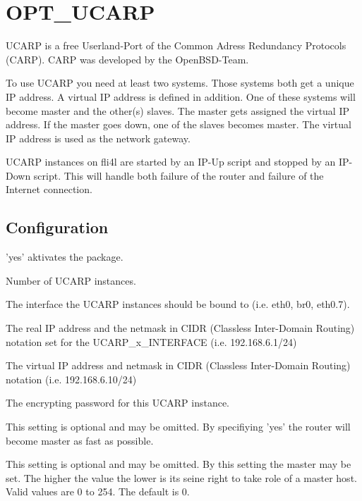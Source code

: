 {
\section {OPT\_UCARP}
}

UCARP is a free Userland-Port of the Common Adress Redundancy Protocols
(CARP). CARP was developed by the OpenBSD-Team.

To use UCARP you need at least two systems. Those systems both get
a unique IP address. A virtual IP address is defined in addition.
One of these systems will become master and the other(s) slaves. The master
gets assigned the virtual IP address. If the master goes down, one of the
slaves becomes master.
The virtual IP address is used as the network gateway.

UCARP instances on fli4l are started by an IP-Up script and stopped
by an IP-Down script. This will handle both failure of the router
and failure of the Internet connection.

\subsection{Configuration}

\begin{description}

'yes' aktivates the package.

Number of UCARP instances.

The interface the UCARP instances should be bound to
(i.e. eth0, br0, eth0.7).

The real IP address and the netmask in CIDR (Classless Inter-Domain Routing)
notation set for the UCARP\_x\_INTERFACE (i.e. 192.168.6.1/24)

The virtual IP address and netmask in CIDR (Classless Inter-Domain
Routing) notation (i.e. 192.168.6.10/24)

The encrypting password for this UCARP instance.

This setting is optional and may be omitted.
By specifiying 'yes' the router will become master as fast as possible.

This setting is optional and may be omitted.
By this setting the master may be set. The higher the value the lower
is its  seine right to take role of a master host. Valid values are 0 to
254. The default is 0.
\end{description}
